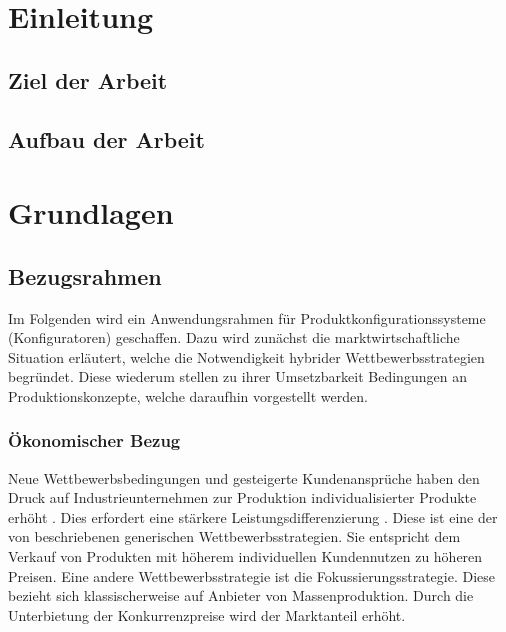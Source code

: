 \documentclass[12pt,a4paper,bibliography=totocnumbered,listof=totoc]{scrartcl}
\begin{document}













\section{Einleitung}

\subsection{Ziel der Arbeit}

\subsection{Aufbau der Arbeit}

\pagebreak

\section{Grundlagen}

\subsection{Bezugsrahmen}
Im Folgenden wird ein Anwendungsrahmen für Produktkonfigurationssysteme (Konfiguratoren) geschaffen. Dazu wird zunächst die marktwirtschaftliche Situation erläutert, welche die Notwendigkeit hybrider Wettbewerbsstrategien begründet. Diese wiederum stellen zu ihrer Umsetzbarkeit Bedingungen an Produktionskonzepte, welche daraufhin vorgestellt werden.

\subsubsection{Ökonomischer Bezug}
\label{subsubsection:oekonomischerBezug}
Neue Wettbewerbsbedingungen und gesteigerte Kundenansprüche haben den Druck auf Industrieunternehmen zur Produktion individualisierter Produkte erhöht \citep{piller98}. Dies erfordert eine stärkere Leistungsdifferenzierung \citep{lutz11}. Diese ist eine der von \citeauthor{porter02} beschriebenen \glqq generischen Wettbewerbsstrategien\grqq{}. Sie entspricht dem Verkauf von Produkten mit höherem individuellen Kundennutzen zu höheren Preisen. Eine andere Wettbewerbsstrategie ist die  Fokussierungsstrategie. Diese bezieht sich klassischerweise auf Anbieter von Massenproduktion. Durch die Unterbietung der Konkurrenzpreise wird der Marktanteil erhöht. 
\end{document}
